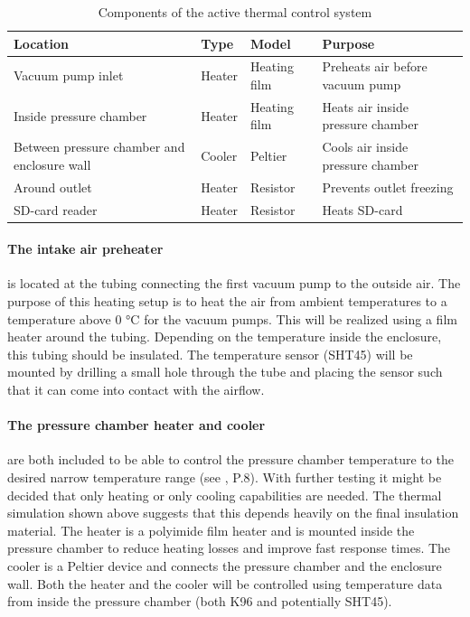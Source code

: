 \begin{table}
  \centering 
  \caption{Components of the active thermal control system}
  \label{tab: comp active thermal control}
  \begin{tabular}{L{5cm} L{1cm} L{1.2cm} L{5cm}}
    \toprule 
    Location & Type & Model & Purpose\\ 
    \midrule 
    Vacuum pump inlet & Heater & Heating film & Preheats air before vacuum pump\\ 
    Inside pressure chamber & Heater & Heating film & Heats air inside pressure chamber\\ 
    Between pressure chamber and enclosure wall & Cooler & Peltier & Cools air inside pressure chamber\\ 
    Around outlet & Heater & Resistor & Prevents outlet freezing\\ 
    SD-card reader & Heater & Resistor & Heats SD-card\\ 
    \bottomrule
  \end{tabular}
\end{table}

\paragraph{The intake air preheater} is located at the tubing connecting the first vacuum pump to the outside air.
The purpose of this heating setup is to heat the air from ambient temperatures to a temperature above 0 °C for the vacuum pumps.
This will be realized using a film heater around the tubing.
Depending on the temperature inside the enclosure, this tubing should be insulated. 
The temperature sensor (SHT45) will be mounted by drilling a small hole through the tube and placing the sensor such that it can come into contact with the airflow.

\paragraph{The pressure chamber heater and cooler} are both included to be able to control the pressure chamber temperature to the desired narrow temperature range (see , P.8). 
With further testing it might be decided that only heating or only cooling capabilities are needed. 
The thermal simulation shown above suggests that this depends heavily on the final insulation material.
The heater is a polyimide film heater and is mounted inside the pressure chamber to reduce heating losses and improve fast response times. 
The cooler is a Peltier device and connects the pressure chamber and the enclosure wall. 
Both the heater and the cooler will be controlled using temperature data from inside the pressure chamber (both K96 and potentially SHT45). 

